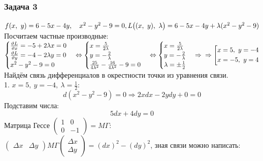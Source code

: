 \documentclass[12pt, letterpaper, twoside]{article}
\begin{document}
    \subsubsection*{Задача 3}
    $f(x,\ y) = 6 - 5x - 4y,\quad x^2 - y^2 - 9 = 0,\\
    L\big( (x,\ y),\ \lambda\big) = 6 - 5x - 4y + \lambda(x^2 - y^2 - 9)$\\
    Посчитаем частные производные:\\
    $\begin{cases}
        \frac{\vartheta L}{\vartheta x} = -5 + 2\lambda x = 0\\
        \frac{\vartheta L}{\vartheta y} = -4 - 2\lambda y = 0\\
        x^2 - y^2 - 9 = 0
    \end{cases}\Leftrightarrow \begin{cases}
        x = \frac{5}{2\lambda}\\
        y = -\frac{2}{\lambda}\\
        \frac{25}{4\lambda^2} - \frac{16}{4\lambda^2} - 9 = 0
    \end{cases}\Leftrightarrow \begin{cases}
        x = \frac{5}{2\lambda}\\
        y = -\frac{2}{\lambda}\\
        \lambda = \pm \frac{1}{2}
    \end{cases}\Rightarrow\\
    \Rightarrow \left[ \begin{gathered}
        x = 5,\ y = -4\\
        x = -5,\ y = 4
    \end{gathered} \right.$\\
    Найдём связь дифференциалов в окрестности точки из уравнения связи.\\
    1. $x = 5,\ y = -4,\ \lambda = \frac{1}{2}$:
    \[d(x^2 - y^2 - 9) = 0\Rightarrow 2xdx - 2ydy + 0 = 0\]
    Подставим числа:
    \[5dx + 4dy = 0\]
    Матрица Гессе $\begin{pmatrix}
        1 & 0\\
        0 & -1
    \end{pmatrix} = M\Gamma$:\\
    $\begin{pmatrix}
        \Delta x & \Delta y
    \end{pmatrix} M\Gamma \begin{pmatrix}
        \Delta x\\
        \Delta y
    \end{pmatrix} = (dx)^2 - (dy)^2$, зная связи можно написать:
\end{document}
